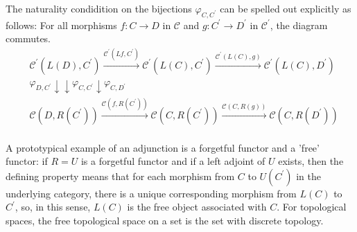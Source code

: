 The naturality condidition on the bijections $\varphi_{C, C^{\prime}}$ can be spelled out explicitly as follows: For all morphisms $f: C \rightarrow D$ in $\mathcal{C}$ and $g: C^{\prime} \rightarrow D^{\prime}$ in $\mathcal{C}^{\prime}$, the diagram commutes.
$$
\begin{aligned}
& \mathcal{C}^{\prime}\left(L(D), C^{\prime}\right) \xrightarrow{\mathcal{C}^{\prime}\left(L f, C^{\prime}\right)} \mathcal{C}^{\prime}\left(L(C), C^{\prime}\right) \xrightarrow{\mathcal{C}^{\prime}(L(C), g)} \mathcal{C}^{\prime}\left(L(C), D^{\prime}\right) \\
& \varphi_{D, C^{\prime}} \downarrow \downarrow \varphi_{C, C^{\prime}} \downarrow \varphi_{C, D^{\prime}} \\
& \mathcal{C}\left(D, R\left(C^{\prime}\right)\right) \xrightarrow{\mathcal{C}\left(f, R\left(C^{\prime}\right)\right)} \mathcal{C}\left(C, R\left(C^{\prime}\right)\right) \xrightarrow{\mathcal{C}(C, R(g))} \mathcal{C}\left(C, R\left(D^{\prime}\right)\right) \\
&
\end{aligned}
$$

\begin{example}
A prototypical example of an adjunction is a forgetful functor and a 'free' functor: if $R=U$ is a forgetful functor and if a left adjoint of $U$ exists, then the defining property means that for each morphism from $C$ to $U\left(C^{\prime}\right)$ in the underlying category, there is a unique corresponding morphism from $L(C)$ to $C^{\prime}$, so, in this sense, $L(C)$ is the free object associated with $C$. For topological spaces, the free topological space on a set is the set with discrete topology.
\end{example}

